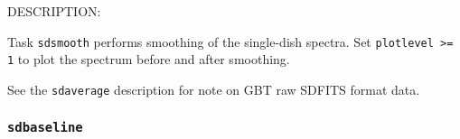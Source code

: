     DESCRIPTION:

    Task {\tt sdsmooth} performs smoothing of the single-dish spectra.
    Set {\tt plotlevel >= 1} to plot the spectrum before and after smoothing.
    
    See the {\tt sdaverage} description for note on GBT raw SDFITS format data.


%    
 
\subsubsection{{\tt sdbaseline}}
\label{section:sd.sdtasks.tasks.sdbaseline}

